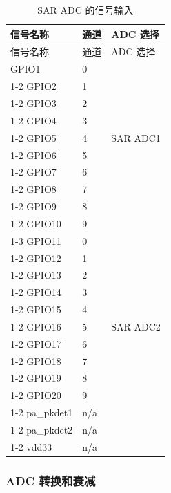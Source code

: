 \documentclass[main\_\_CN.tex]{subfiles}
\begin{document}
\begin{longtable}{ |p{3cm}|p{1.5cm}|p{2cm}| }
    \caption{SAR ADC 的信号输入}
    \label{table:adc inputs}
    \\\hline
    \rowcolor{lightgray}
    信号名称 & 通道  & ADC 选择 \\\hline
    \endfirsthead
    \hline
    \rowcolor{lightgray}
    信号名称 & 通道  & ADC 选择 \\\hline
    \endhead
    \hline
    \endfoot
    GPIO1       &  0  & \multirow{9}{*}{SAR ADC1} \\ \cline{1-2}
    GPIO2       &  1  & \\ \cline{1-2}
    GPIO3       &  2  & \\ \cline{1-2}
    GPIO4       &  3  & \\ \cline{1-2}
    GPIO5       &  4  & \\ \cline{1-2}
    GPIO6       &  5  & \\ \cline{1-2}
    GPIO7       &  6  & \\ \cline{1-2}
    GPIO8       &  7  & \\ \cline{1-2}
    GPIO9       &  8  & \\ \cline{1-2}
    GPIO10      &  9  & \multirow{13}{*}{SAR ADC2} \\ \cline{1-3}
    GPIO11      &  0  & \\ \cline{1-2}
    GPIO12      &  1  & \\ \cline{1-2}
    GPIO13      &  2  & \\ \cline{1-2}
    GPIO14      &  3  & \\ \cline{1-2}
    GPIO15      &  4  & \\ \cline{1-2}
    GPIO16      &  5  & \\ \cline{1-2}
    GPIO17      &  6  & \\ \cline{1-2}
    GPIO18      &  7  & \\ \cline{1-2}
    GPIO19      &  8  & \\ \cline{1-2}
    GPIO20      &  9  & \\ \cline{1-2}
    pa\_pkdet1    &  n/a  & \\ \cline{1-2}
    pa\_pkdet2    &  n/a  & \\ \cline{1-2}
    vdd33         &  n/a  &
\end{longtable}

\subsubsection{ADC 转换和衰减}
\end{document}
